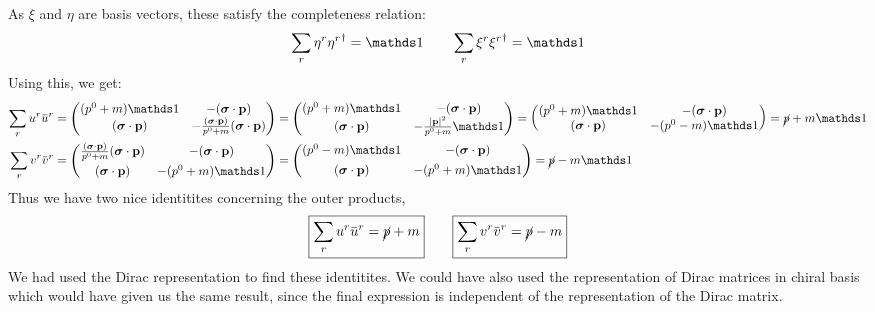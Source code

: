 As $\xi$ and $\eta$ are basis vectors, these satisfy the completeness relation:
$$\sum\limits_{r}  \eta^r {\eta^r}^\dagger= \iden \qquad \sum\limits_{r}  \xi^r {\xi^r}^\dagger= \iden$$
Using this, we get:
\begin{align*}
    \sum\limits_{r}  u^r  \dadj{u}^r &= \mqty((p^0+m)\iden & - {(\bs{\sigma}\cdot \vb{p})}\\ {(\bs{\sigma}\cdot \vb{p})}& -{\frac{(\bs{\sigma}\cdot \vb{p})}{p^0+m}}{(\bs{\sigma}\cdot \vb{p})}  ) =\mqty((p^0+m)\iden & - {(\bs{\sigma}\cdot \vb{p})}\\ {(\bs{\sigma}\cdot \vb{p})}& -\frac{|\vb{p}|^2}{p^0+m}\iden  ) =\mqty((p^0+m)\iden & - {(\bs{\sigma}\cdot \vb{p})}\\ {(\bs{\sigma}\cdot \vb{p})}& -(p^0-m)\iden  ) = \gsl{p}+m\iden\\
    \sum\limits_{r}  v^r  \dadj{v}^r &= \mqty(  {\frac{(\bs{\sigma}\cdot \vb{p})}{p^0+m}}{(\bs{\sigma}\cdot \vb{p})}       & -{(\bs{\sigma}\cdot \vb{p})}  \\[0.15cm] {(\bs{\sigma}\cdot \vb{p})}&   -(p^0+m)\iden   )=\mqty(  (p^0-m)\iden       & -{(\bs{\sigma}\cdot \vb{p})}  \\[0.15cm] {(\bs{\sigma}\cdot \vb{p})}&   -(p^0+m)\iden   )  = \gsl{p}-m\iden
\end{align*}
Thus we have two nice identitites concerning the outer products,
\begin{align}\label{eqn:spinsum}
    \boxed{ \sum\limits_{r}  u^r  \dadj{u}^r = \gsl{p}+m} \qquad \boxed{ \sum\limits_{r}  v^r  \dadj{v}^r = \gsl{p}-m}
\end{align}
We had used the Dirac representation to find these identitites. We could have also used the representation of Dirac matrices in chiral basis which would have given us the same result, since the final expression is independent of the representation of the Dirac matrix.
